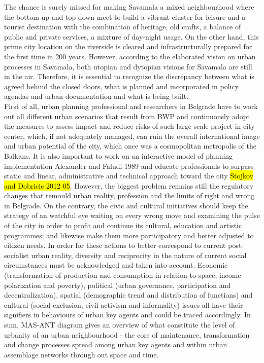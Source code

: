 \documentclass[11pt]{report}
\begin{document}
The chance is surely missed for making Savamala a mixed neighbourhood where the bottom-up and top-down meet to build a vibrant cluster for leisure and a tourist destination with the combination of heritage, old crafts, a balance of public and private services, a mixture of day-night usage.
On the other hand, this prime city location on the riverside is cleared and infrastructurally prepared for the first time in 200 years.
However, according to the elaborated vision on urban processes in Savamala, both utopian and dytopian visions for Savamala are still in the air.
Therefore, it is essential to recognize the discrepancy between what is agreed behind the closed doors, what is planned and incorporated in policy agendas and urban documentation and what is being built.
\\
First of all, urban planning professional and researchers in Belgrade have to work out all different urban scenarios that result from BWP and continuously adopt the measures to assess impact and reduce risks of such large-scale project in city center, which, if not adequately managed, can ruin the overall international image and urban potential of the city, which once was a cosmopolitan metropolis of the Balkans.
It is also important to work on an interactive model of planning implementation {Alexander and Faludi 1989} and educate professionals to surpass static and linear, administrative and technical approach toward the city \hl{Stojkov and Dobricic 2012 05}.
However, the biggest problem remains still the regulatory changes that remould urban reality, profession and the limits of right and wrong in Belgrade.
On the contrary, the civic and cultural initiatives should keep the strategy of an watchful eye waiting on every wrong move and examining the pulse of the city in order to profit and continue its cultural, education and artistic programmes; and likewise make them more participatory and better adjusted to citizen needs.
In order for these actions to better correspond to current post-socialist urban reality, diversity and reciprocity in the nature of current social circumstances must be acknowledged and taken into account. Economic (transformation of production and consumption in relation to space, income polarization and poverty), political (urban governance, participation and decentralization), spatial (demographic trend and distribution of functions) and cultural (social exclusion, civil activism and informality) issues all have their signifiers in behaviours of urban key agents and could be traced accordingly.
In sum, MAS-ANT diagram gives an overview of what constitute the level of urbanity of an urban neighbourhood - the core of maintenance, transformation and change processes spread among urban key agents and within urban assemblage networks through out space and time.
\end{document}
